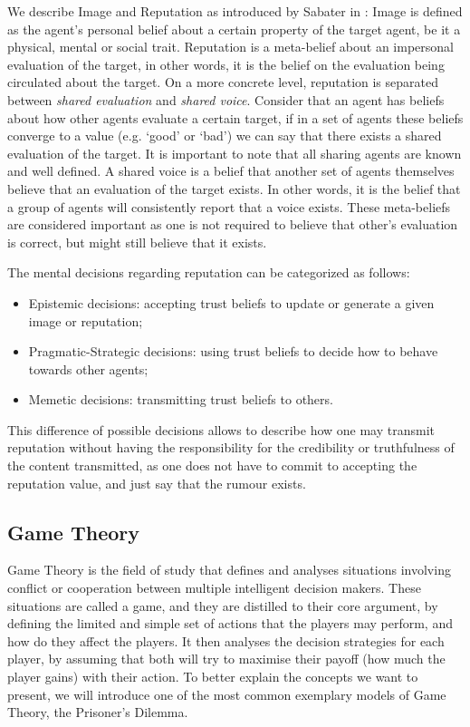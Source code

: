 We describe Image and Reputation as introduced by Sabater in \cite{Sabater2006}:
Image is defined as the agent's personal belief about a certain property of the target agent, be it a physical, mental or social trait. Reputation is a meta-belief about an impersonal evaluation of the target, in other words, it is the belief on the evaluation being circulated about the target. On a more concrete level, reputation is separated between \textit{shared evaluation} and \textit{shared voice}. Consider that an agent has beliefs about how other agents evaluate a certain target, if in a set of agents these beliefs converge to a value (e.g. `good' or `bad') we can say that there exists a shared evaluation of the target. It is important to note that all sharing agents are known and well defined. A shared voice is a belief that another set of agents themselves believe that an evaluation of the target exists. In other words, it is the belief that a group of agents will consistently report that a voice exists. These meta-beliefs are considered important as one is not required to believe that other's evaluation is correct, but might still believe that it exists.

The mental decisions regarding reputation can be categorized as follows:
\begin{itemize}
	\item Epistemic decisions: accepting trust beliefs to update or generate a given image or reputation;
	\item Pragmatic-Strategic decisions: using trust beliefs to decide how to behave towards other agents;
	\item Memetic decisions: transmitting trust beliefs to others. 
\end{itemize}
This difference of possible decisions allows to describe how one may transmit reputation without having the responsibility for the credibility or truthfulness of the content transmitted, as one does not have to commit to accepting the reputation value, and just say that the rumour exists.


\subsection{Game Theory}
\label{subsec:GameTheory}
Game Theory is the field of study that defines and analyses situations involving conflict or cooperation between multiple intelligent decision makers. These situations are called a game, and they are distilled to their core argument, by defining the limited and simple set of actions that the players may perform, and how do they affect the players. It then analyses the decision strategies for each player, by assuming that both will try to maximise their payoff (how much the player gains) with their action. To better explain the concepts we want to present, we will introduce one of the most common exemplary models of Game Theory, the Prisoner's Dilemma.

